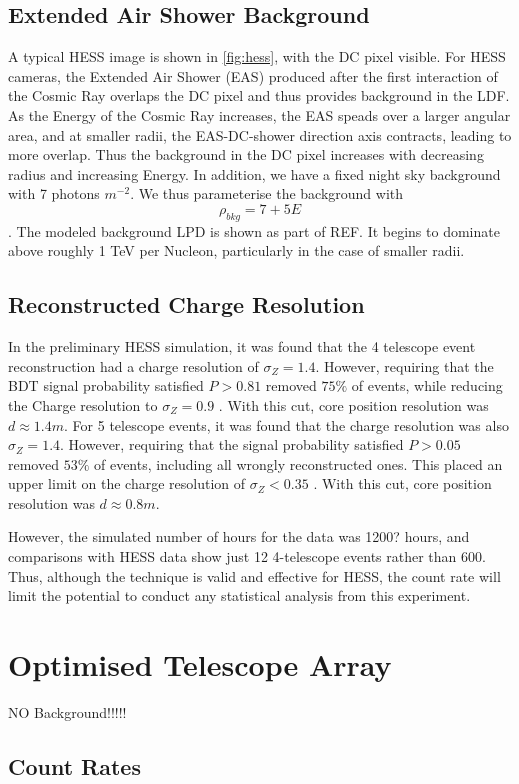 \documentclass{article}
\begin{document}
\subsection{Extended Air Shower Background}
A typical HESS image is shown in \ref{fig:hess}, with the DC pixel visible. For HESS cameras, the Extended Air Shower (EAS) produced after the first interaction of the Cosmic Ray overlaps the DC pixel and thus provides background in the LDF. As the Energy of the Cosmic Ray increases, the EAS speads over a larger angular area, and at smaller radii, the EAS-DC-shower direction axis contracts, leading to more overlap. Thus the background in the DC pixel increases with decreasing radius and increasing Energy. In addition, we have a fixed night sky background with 7 photons $m^{-2}$. We thus parameterise the background with \[ \rho_{bkg}  = 7 + 5E\]. The modeled background LPD is shown as part of REF. It begins to dominate above roughly 1 TeV per Nucleon, particularly in the case of smaller radii. 

\subsection{Reconstructed Charge Resolution}
In the preliminary HESS simulation, it was found that the 4 telescope event reconstruction had a charge resolution of $\sigma_{Z} = 1.4$. However, requiring that the BDT signal probability satisfied $P > 0.81$ removed $75 \%$ of events, while reducing the Charge resolution to $\sigma_{Z} = 0.9$ . With this cut, core position resolution was $d \approx 1.4 m $. For 5 telescope events, it was found that the charge resolution was also $\sigma_{Z} = 1.4$. However, requiring that the signal probability satisfied $P > 0.05$ removed $53 \%$ of events, including all wrongly reconstructed ones. This placed an upper limit on the charge resolution of $\sigma_{Z} < 0.35$ . With this cut, core position resolution was $d \approx 0.8 m $.

However, the simulated number of hours for the data was 1200? hours, and comparisons with HESS data show just 12 4-telescope events rather than 600. Thus, although the technique is valid and effective for HESS, the count rate will limit the potential to conduct any statistical analysis from this experiment.

\section{Optimised Telescope Array}
NO Background!!!!!
\subsection{Count Rates}
\end{document}
